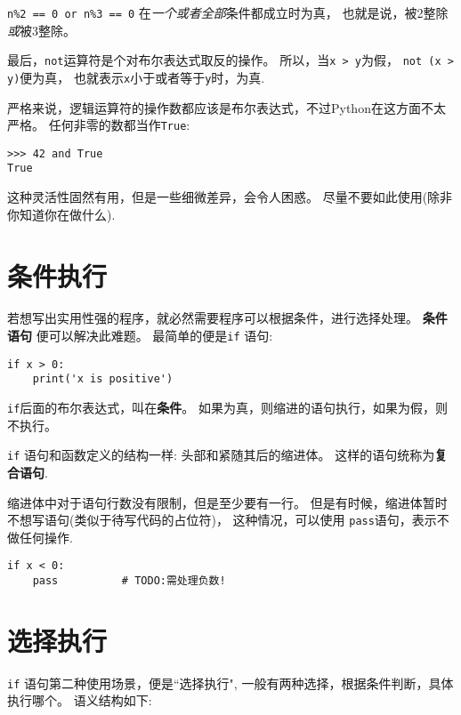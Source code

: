 \documentclass[10pt]{book}
\begin{document}
{\tt n\%2 == 0 or n\%3 == 0} 在{\em 一个或者全部}条件都成立时为真，
也就是说，被2整除{\em 或}被3整除。

最后，{\tt not}运算符是个对布尔表达式取反的操作。
所以，当{\tt x > y}为假， {\tt not (x > y)}便为真，
也就表示{\tt x}小于或者等于{\tt y}时，为真.

严格来说，逻辑运算符的操作数都应该是布尔表达式，不过Python在这方面不太严格。
任何非零的数都当作{\tt True}:

\begin{verbatim}
>>> 42 and True
True
\end{verbatim}
%
这种灵活性固然有用，但是一些细微差异，会令人困惑。
尽量不要如此使用(除非你知道你在做什么).


\section{条件执行}
\label{conditional.execution}

若想写出实用性强的程序，就必然需要程序可以根据条件，进行选择处理。
{\bf 条件语句} 便可以解决此难题。
最简单的便是{\tt if} 语句:

\begin{verbatim}
if x > 0:
    print('x is positive')
\end{verbatim}
%
{\tt if}后面的布尔表达式，叫在{\bf 条件}。
如果为真，则缩进的语句执行，如果为假，则不执行。

{\tt if} 语句和函数定义的结构一样: 头部和紧随其后的缩进体。
这样的语句统称为{\bf 复合语句}.

缩进体中对于语句行数没有限制，但是至少要有一行。
但是有时候，缩进体暂时不想写语句(类似于待写代码的占位符)，
这种情况，可以使用 {\tt pass}语句，表示不做任何操作.

\begin{verbatim}
if x < 0:
    pass          # TODO:需处理负数!
\end{verbatim}
%

\section{选择执行}
\label{alternative.execution}
{\tt if} 语句第二种使用场景，便是``选择执行",
一般有两种选择，根据条件判断，具体执行哪个。
语义结构如下:
\end{document}
